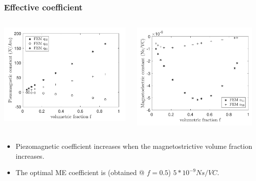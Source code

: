 \documentclass[compress]{beamer}
\begin{document}
\begin{frame}\frametitle{Effective coefficient}
\begin{columns}[totalwidth=\textwidth]
	\begin{column}{.49\textwidth}
	\centering
	\includegraphics[width=0.99\textwidth]{Graphic/04_cubematqu.pdf}
	\end{column}
	\begin{column}{.49\textwidth}
	\centering	
	\includegraphics[width=0.99\textwidth]{Graphic/04_cubematalpha.pdf}
	\end{column}
\end{columns}
\begin{exampleblock}{}
   \begin{itemize}[label=$\bullet$, font=\small, leftmargin=*]
	\item Piezomagnetic coefficient increases when the magnetostrictive volume fraction increases.
	\item The optimal ME coefficient is (obtained @ $f=0.5$) $5*10^{-9} Ns/VC$.
	\end{itemize}
	\end{exampleblock}
	

\end{frame}
\end{document}
